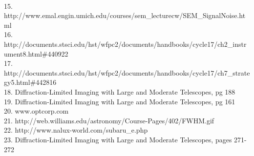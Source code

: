 \documentclass[pdf,color]{UoBnote}
\begin{document}
\\
15. http://www.emal.engin.umich.edu/courses/sem\_lecturecw/SEM\_SignalNoise.html
\\
16.	http://documents.stsci.edu/hst/wfpc2/documents/handbooks/cycle17/ch2\_instrument8.html\#440922
\\
17.	http://documents.stsci.edu/hst/wfpc2/documents/handbooks/cycle17/ch7\_strategy5.html\#442816
\\
18. Diffraction-Limited Imaging with Large and Moderate Telescopes, pg 188
\\
19. Diffraction-Limited Imaging with Large and Moderate Telescopes, pg 161
\\
20. www.optcorp.com
\\
21. http://web.williams.edu/astronomy/Course-Pages/402/FWHM.gif
\\
22. http://www.nalux-world.com/subaru\_e.php 
\\
23. Diffraction-Limited Imaging with Large and Moderate Telescopes, pages 271-272
\end{document}
